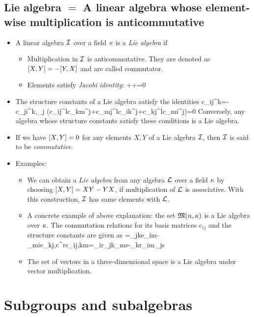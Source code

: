 \subsection{Lie algebra $=$ A linear algebra whose element-wise multiplication is anticommutative}
\begin{itemize}
	\item A linear algebra $\mathcal{I}$ over a field $\kappa$ is a \emph{Lie algebra} if 
	\begin{itemize}
		\item Multiplication in $\mathcal{I}$ is anticommutative. They are denoted as $\comm{X}{Y}=-\comm{Y}{X}$ and are called commutator.
		\item Elements satisfy \emph{Jacobi identity}:
		\be 
		++=0
		\ee 
	\end{itemize}
	\item The structure constants of a Lie algebra satisfy the identities
	\be 
	c_{ij}^k=-c_{ji}^k\;,\quad \sum\limits_{j} \left(c_{ij}^lc_{km}^j+c_{mj}^lc_{ik}^j+c_{kj}^lc_{mi}^j\right)=0
	\ee 
	Conversely, any algebra whose structure constants satisfy these conditions is a Lie algebra.
	\item If we have $\comm{X}{Y}=0$ for any elements $X,Y$ of a Lie algebra $\mathcal{I}$, then $\mathcal{I}$ is said to be \emph{commutative}.
	\item Examples:
	\begin{itemize}
		\item We can obtain a \emph{Lie algebra} from any algebra $\mathcal{L}$ over a field $\kappa$ by choosing $\comm{X}{Y}=XY-YX$, if multiplication of $\mathcal{L}$ is associative. With this construction, $\mathcal{I}$ has same elements with $\mathcal{L}$.
		\item A concrete example of above explanation: the set $\mathfrak{M}(n,\kappa)$ is a Lie algebra over $\kappa$. The commutation relations for its basis matrices $e_{ij}$ and the structure constants are given as
		\be 
		=\delta_{jk}e_{im}-\delta_{mi}e_{kj}\;,\quad c^{rs}_{ij,km}=\delta_{ir}\delta_{jk}\delta_{ms}-\delta_{kr}\delta_{im}\delta_{js}
		\ee 
		\item The set of vectors in a three-dimensional space is a Lie algebra under vector multiplication.
	\end{itemize}
\end{itemize}

\section{Subgroups and subalgebras}
